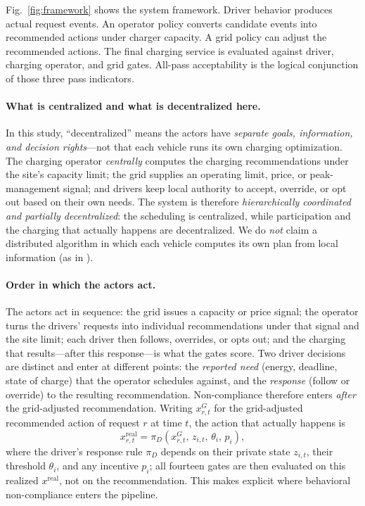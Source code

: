 \documentclass[12pt]{article}
\newcommand{\figref}[1]{Fig.~\ref{#1}}
\begin{document}
\figref{fig:framework} shows the system framework. Driver behavior produces actual request events. An operator policy converts candidate events into recommended actions under charger capacity. A grid policy can adjust the recommended actions. The final charging service is evaluated against driver, charging operator, and grid gates. All-pass acceptability is the logical conjunction of those three pass indicators.

\paragraph{What is centralized and what is decentralized here.} In this study, ``decentralized'' means the actors have \emph{separate goals, information, and decision rights}---not that each vehicle runs its own charging optimization. The charging operator \emph{centrally} computes the charging recommendations under the site's capacity limit; the grid supplies an operating limit, price, or peak-management signal; and drivers keep local authority to accept, override, or opt out based on their own needs. The system is therefore \emph{hierarchically coordinated and partially decentralized}: the scheduling is centralized, while participation and the charging that actually happens are decentralized. We do \emph{not} claim a distributed algorithm in which each vehicle computes its own plan from local information (as in \cite{ma2013,gan2013,liu2019decentralized}).

\paragraph{Order in which the actors act.} The actors act in sequence: the grid issues a capacity or price signal; the operator turns the drivers' requests into individual recommendations under that signal and the site limit; each driver then follows, overrides, or opts out; and the charging that results---after this response---is what the gates score. Two driver decisions are distinct and enter at different points: the \emph{reported need} (energy, deadline, state of charge) that the operator schedules against, and the \emph{response} (follow or override) to the resulting recommendation. Non-compliance therefore enters \emph{after} the grid-adjusted recommendation. Writing $x^{G}_{r,t}$ for the grid-adjusted recommended action of request $r$ at time $t$, the action that actually happens is
\begin{equation}
x^{\mathrm{real}}_{r,t}=\pi_D\!\left(x^{G}_{r,t},\,z_{i,t},\,\theta_i,\,p_i\right),
\label{eq:driverresponse}
\end{equation}
where the driver's response rule $\pi_D$ depends on their private state $z_{i,t}$, their threshold $\theta_i$, and any incentive $p_i$; all fourteen gates are then evaluated on this realized $x^{\mathrm{real}}$, not on the recommendation. This makes explicit where behavioral non-compliance enters the pipeline.
\end{document}
